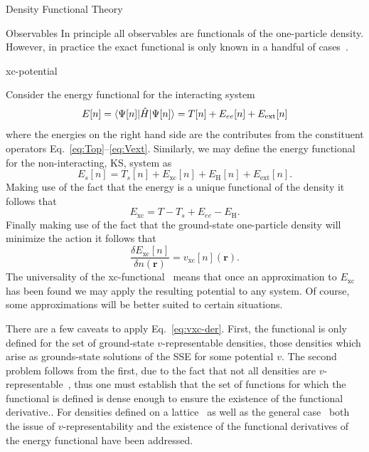 \documentclass[letterpaper, 11 pt]{report}
\begin{document}
\begin{chapter}{Density Functional Theory \label{chap:dft}}
\begin{section}{Observables \label{sec:obs}}
      In principle all observables are functionals of the one-particle density. However, in practice the
      exact functional is only known in a handful of cases~\cite[p. 211-213]{obs_exac}.

   \end{section}

   \begin{section}{xc-potential \label{sec:xcpot}}

      Consider the energy functional for the interacting system
      \begin{equation} \label{eq:efunc}
         E[n] = \braket{\Psi[n] | \hat{H} | \Psi[n] }= T[n] + E_{ee}[n] + E_\mathrm{ext}[n]
      \end{equation}
      where the energies on the right hand side are the contributes from the constituent operators
      Eq.~\eqref{eq:Top}--\eqref{eq:Vext}. Similarly, we may define the energy functional for the
      non-interacting, KS, system as
      \begin{equation} \label{eq:esfunc}
         E_s[n] =  T_s[n] + E_\mathrm{xc}[n] + E_\mathrm{H}[n] + E_\mathrm{ext}[n].
      \end{equation}
      Making use of the fact that the energy is a unique functional of the density it follows that
      \begin{equation} \label{eq:exc}
         E_\mathrm{xc} = T - T_s + E_{ee} - E_\mathrm{H}.
      \end{equation}
      Finally making use of the fact that the ground-state one-particle density will minimize the action
      it follows that
      \begin{equation} \label{eq:vxc-der}
         \frac{\delta E_\mathrm{xc}[n]}{\delta n(\mathbf{r})} = v_\mathrm{xc}[n](\mathbf{r}).
      \end{equation}
      The universality of the xc-functional~\cite{dft-engel} means that once an approximation to
      $E_\mathrm{xc}$ has been found we may apply the resulting potential to any system. Of course,
      some approximations will be better suited to certain situations.

      There are a few caveats to apply Eq.~\eqref{eq:vxc-der}. First, the functional is only defined
      for the set of ground-state $v$-representable densities, those densities which arise as
      grounds-state solutions of the SSE for some potential $v$. The second problem follows from the
      first, due to the fact that not all densities are $v$-representable~\cite{not-vrep1, not-vrep2,
      not-vrep3}, thus one must establish that the set of functions for which the functional is defined
      is dense enough to ensure the existence of the functional derivative.. For densities defined on a
      lattice~\cite{vrep-lat} as well as the general case~\cite{nonint1, nonint2, vrep-levy1,
      vrep-levy2, vrep-lieb, vrep-rev} both the issue of $v$-representability and the existence of the
      functional derivatives of the energy functional have been addressed.


\end{section}
\end{chapter}
\end{document}
